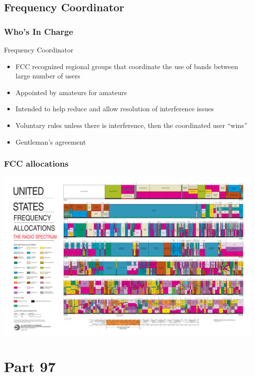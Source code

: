 \documentclass[10pt, handout]{beamer}
\begin{document}
\subsection{Frequency Coordinator}

\begin{frame}
\frametitle{Who's In Charge}
Frequency Coordinator
\begin{itemize}
\item FCC recognized regional groups that coordinate the use of bands between large number of users \pause
\item Appointed by amateurs for amateurs \pause
\item Intended to help reduce and allow resolution of interference issues \pause
\item Voluntary rules unless there is interference, then the coordinated user ``wins''\pause
\item Gentleman's agreement
\end{itemize}
\end{frame}

\begin{frame}
\frametitle{FCC allocations}
\begin{center}
\includegraphics[width=\textwidth]{2003-allochrt.pdf}
\end{center}
\end{frame}

\section{Part 97}
\end{document}
